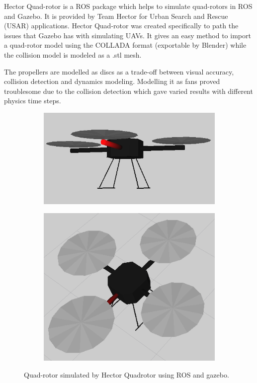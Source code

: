 \documentclass[BTech]{iitmdiss}
\begin{document}
Hector Quad-rotor \cite{HectorQuadrotor} is a ROS package which helps to simulate quad-rotors in ROS and Gazebo. It is provided by Team Hector for Urban Search and Rescue (USAR) applications. Hector Quad-rotor was created specifically to path the issues that Gazebo has with simulating UAVs. It gives an easy method to import a quad-rotor model using the COLLADA format (exportable by Blender) while the collision model is modeled as a .stl mesh.

The propellers are modelled as discs as a trade-off between visual accuracy, collision detection and dynamics modeling. Modelling it as fans proved troublesome due to the collision detection which gave varied results with different physics time steps.

\begin{figure}[h]
  \centering
    \begin{subfigure}[c]{0.45\textwidth}
      \centering
        \includegraphics[width=\textwidth]{quadrotor_sim.png}
        \caption{\label{fig:fig1}}
    \end{subfigure}
    \begin{subfigure}[c]{0.45\textwidth}
      \centering
        \includegraphics[width=\textwidth]{quadrotor_sim2.png}
        \caption{\label{fig:fig2}}
    \end{subfigure}
    \caption{Quad-rotor simulated by Hector Quadrotor using ROS and gazebo.}
\end{figure}
\end{document}
